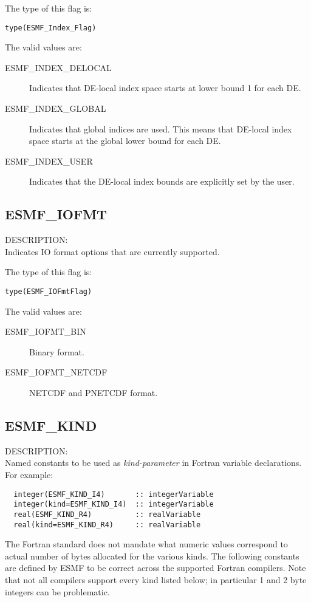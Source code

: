 The type of this flag is:

{\tt type(ESMF\_Index\_Flag)}

The valid values are:
\begin{description}
\item [ESMF\_INDEX\_DELOCAL]
      Indicates that DE-local index space starts at lower bound 1 for each DE.
\item [ESMF\_INDEX\_GLOBAL]
      Indicates that global indices are used. This means that DE-local index
      space starts at the global lower bound for each DE.
\item [ESMF\_INDEX\_USER]
      Indicates that the DE-local index bounds are explicitly set by the user.
\end{description}

\subsection{ESMF\_IOFMT}
\label{opt:iofmtflag}
{\sf DESCRIPTION:\\}
Indicates IO format options that are currently supported.

The type of this flag is:

{\tt type(ESMF\_IOFmtFlag)}

The valid values are:
\begin{description}
\item [ESMF\_IOFMT\_BIN]
      Binary format.
\item [ESMF\_IOFMT\_NETCDF]
      NETCDF and PNETCDF format.
\end{description}

\subsection{ESMF\_KIND}
\label{const:kind}

{\sf DESCRIPTION:\\}
Named constants to be used as {\em kind-parameter} in Fortran variable
declarations. For example:
\begin{verbatim}
  integer(ESMF_KIND_I4)       :: integerVariable
  integer(kind=ESMF_KIND_I4)  :: integerVariable
  real(ESMF_KIND_R4)          :: realVariable
  real(kind=ESMF_KIND_R4)     :: realVariable
\end{verbatim}
The Fortran standard does not mandate what numeric values correspond to
actual number of bytes allocated for the various kinds. The following constants
are defined by ESMF to be correct across the supported Fortran compilers.
Note that not all compilers support every kind listed below; in particular
1 and 2 byte integers can be problematic.

